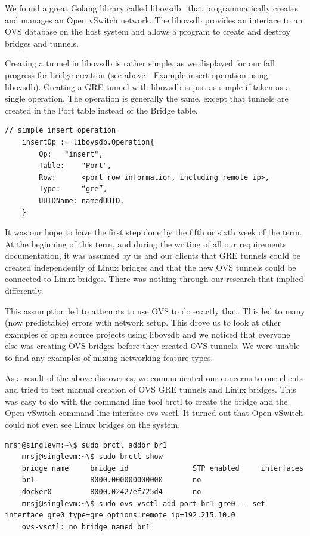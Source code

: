 \documentclass[10pt,onecolumn,journal,draftclsnofoot]{IEEEtran}
\begin{document}
We found a great Golang library called libovsdb~\cite{libovsdb} that
programmatically creates and manages an Open vSwitch network. The libovsdb
provides an interface to an OVS database on the host system and allows a program
to create and destroy bridges and tunnels.

Creating a tunnel in libovsdb is rather simple, as we displayed for our fall
progress for bridge creation (see above - Example insert operation using
libovsdb). Creating a GRE tunnel with libovsdb is just as simple if taken as a
single operation. The operation is generally the same, except that tunnels are
created in the Port table instead of the Bridge table.

\begin{lstlisting}[caption=Example tunnel insert operation using libovsdb]
	// simple insert operation
	insertOp := libovsdb.Operation{
		Op:	  "insert",
		Table:	  "Port",
		Row:	  <port row information, including remote ip>,
		Type:     “gre”,
		UUIDName: namedUUID,
	}
\end{lstlisting}

It was our hope to have the first step done by the fifth or sixth week of the
term. At the beginning of this term, and during the writing of all our
requirements documentation, it was assumed by us and our clients that GRE
tunnels could be created independently of Linux bridges and that the new OVS
tunnels could be connected to Linux bridges. There was nothing through our
research that implied differently.

This assumption led to attempts to use OVS to do exactly that. This led to many
(now predictable) errors with network setup. This drove us to look at other
examples of open source projects using libovsdb and we noticed that everyone
else was creating OVS bridges before they created OVS tunnels. We were unable to
find any examples of mixing networking feature types.

As a result of the above discoveries, we communicated our concerns to our
clients and tried to test manual creation of OVS GRE tunnels and Linux bridges.
This was easy to do with the command line tool brctl to create the bridge and
the Open vSwitch command line interface ovs-vsctl. It turned out that Open
vSwitch could not even see Linux bridges on the system.

\begin{lstlisting}[caption=No Linux Bridge and OVS Tunnel]
	mrsj@singlevm:~\$ sudo brctl addbr br1
	mrsj@singlevm:~\$ sudo brctl show
	bridge name     bridge id               STP enabled     interfaces
	br1             8000.000000000000       no
	docker0         8000.02427ef725d4       no
	mrsj@singlevm:~\$ sudo ovs-vsctl add-port br1 gre0 -- set interface gre0 type=gre options:remote_ip=192.215.10.0
	ovs-vsctl: no bridge named br1
\end{lstlisting}
\end{document}
